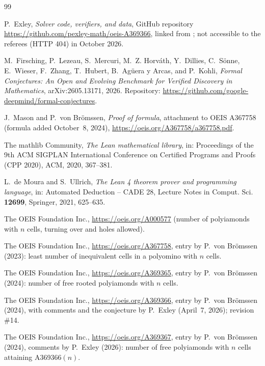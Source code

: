 \documentclass[11pt]{amsart}
\theoremstyle{plain}
\theoremstyle{definition}
\begin{document}
\begin{thebibliography}{99}

P.~Exley, \emph{Solver code, verifiers, and data}, GitHub repository \url{https://github.com/pexley-math/oeis-A369366}, linked from \cite{A369366}; not accessible to the referees (HTTP 404) in October 2026.

M.~Firsching, P.~Lezeau, S.~Mercuri, M.~Z. Horv\'ath, Y.~Dillies, C.~S\"onne, E.~Wieser, F.~Zhang, T.~Hubert, B.~Ag\"uera y Arcas, and P.~Kohli, \emph{Formal Conjectures: An Open and Evolving Benchmark for Verified Discovery in Mathematics}, arXiv:2605.13171, 2026. Repository: \url{https://github.com/google-deepmind/formal-conjectures}.

J.~Mason and P.~von Brömssen, \emph{Proof of formula}, attachment to OEIS A367758 (formula added October~8, 2024), \url{https://oeis.org/A367758/a367758.pdf}.

The mathlib Community, \emph{The Lean mathematical library}, in: Proceedings of the 9th ACM SIGPLAN International Conference on Certified Programs and Proofs (CPP 2020), ACM, 2020, 367--381.

L.~de Moura and S.~Ullrich, \emph{The Lean 4 theorem prover and programming language}, in: Automated Deduction -- CADE 28, Lecture Notes in Comput. Sci. \textbf{12699}, Springer, 2021, 625--635.

The OEIS Foundation Inc., \url{https://oeis.org/A000577} (number of polyiamonds with $n$ cells, turning over and holes allowed).

The OEIS Foundation Inc., \url{https://oeis.org/A367758}, entry by P.~von Brömssen (2023): least number of inequivalent cells in a polyomino with $n$ cells.

The OEIS Foundation Inc., \url{https://oeis.org/A369365}, entry by P.~von Brömssen (2024): number of free rooted polyiamonds with $n$ cells.

The OEIS Foundation Inc., \url{https://oeis.org/A369366}, entry by P.~von Brömssen (2024), with comments and the conjecture by P.~Exley (April~7, 2026); revision \#14.

The OEIS Foundation Inc., \url{https://oeis.org/A369367}, entry by P.~von Brömssen (2024), comments by P.~Exley (2026): number of free polyiamonds with $n$ cells attaining A369366$(n)$.

\end{thebibliography}
\end{document}
